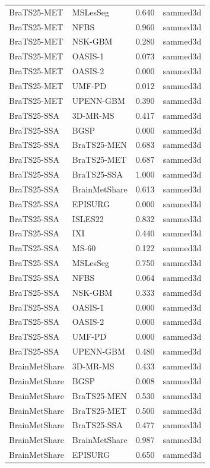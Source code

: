 \begin{tabular}{llrl}
BraTS25-MET & MSLesSeg & 0.640 & sammed3d \\
BraTS25-MET & NFBS & 0.960 & sammed3d \\
BraTS25-MET & NSK-GBM & 0.280 & sammed3d \\
BraTS25-MET & OASIS-1 & 0.073 & sammed3d \\
BraTS25-MET & OASIS-2 & 0.000 & sammed3d \\
BraTS25-MET & UMF-PD & 0.012 & sammed3d \\
BraTS25-MET & UPENN-GBM & 0.390 & sammed3d \\
BraTS25-SSA & 3D-MR-MS & 0.417 & sammed3d \\
BraTS25-SSA & BGSP & 0.000 & sammed3d \\
BraTS25-SSA & BraTS25-MEN & 0.683 & sammed3d \\
BraTS25-SSA & BraTS25-MET & 0.687 & sammed3d \\
BraTS25-SSA & BraTS25-SSA & 1.000 & sammed3d \\
BraTS25-SSA & BrainMetShare & 0.613 & sammed3d \\
BraTS25-SSA & EPISURG & 0.000 & sammed3d \\
BraTS25-SSA & ISLES22 & 0.832 & sammed3d \\
BraTS25-SSA & IXI & 0.440 & sammed3d \\
BraTS25-SSA & MS-60 & 0.122 & sammed3d \\
BraTS25-SSA & MSLesSeg & 0.750 & sammed3d \\
BraTS25-SSA & NFBS & 0.064 & sammed3d \\
BraTS25-SSA & NSK-GBM & 0.333 & sammed3d \\
BraTS25-SSA & OASIS-1 & 0.000 & sammed3d \\
BraTS25-SSA & OASIS-2 & 0.000 & sammed3d \\
BraTS25-SSA & UMF-PD & 0.000 & sammed3d \\
BraTS25-SSA & UPENN-GBM & 0.480 & sammed3d \\
BrainMetShare & 3D-MR-MS & 0.433 & sammed3d \\
BrainMetShare & BGSP & 0.008 & sammed3d \\
BrainMetShare & BraTS25-MEN & 0.530 & sammed3d \\
BrainMetShare & BraTS25-MET & 0.500 & sammed3d \\
BrainMetShare & BraTS25-SSA & 0.477 & sammed3d \\
BrainMetShare & BrainMetShare & 0.987 & sammed3d \\
BrainMetShare & EPISURG & 0.650 & sammed3d \\

\end{tabular}
